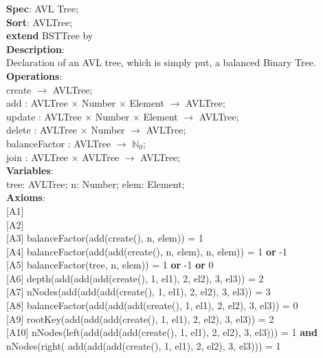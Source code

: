 \documentclass[12pt]{article}
\begin{document}
\begin{spacing}{1.5}
\noindent \textbf{Spec}: AVL Tree;\\
\noindent \textbf{Sort}: AVLTree;\\
\noindent \textbf{extend} BSTTree by\\
\noindent \textbf{Description}:\\Declaration of an AVL tree, which is simply put, a balanced Binary Tree.\\
\noindent \textbf{Operations}:\\
\hspace*{5mm} create $\rightarrow$ AVLTree;\\
\hspace*{5mm} add : AVLTree $\times$ Number $\times$ Element $\rightarrow$ AVLTree;\\
\hspace*{5mm} update : AVLTree $\times$ Number $\times$ Element $\rightarrow$ AVLTree;\\
\hspace*{5mm} delete : AVLTree $\times$ Number $\rightarrow$ AVLTree;\\
\hspace*{5mm} balanceFactor :  AVLTree $\rightarrow$ $\mathbb{N}_0$;\\
\hspace*{5mm} join : AVLTree $\times$ AVLTree $\rightarrow$ AVLTree;\\
\noindent \textbf{Variables}:\\
\hspace*{5mm} tree: AVLTree; n: Number; elem: Element;\\
\noindent \textbf{Axioms}:\\
\hspace*{5mm} [A1] \\
\hspace*{5mm} [A2] \\
\hspace*{5mm} [A3]  balanceFactor(add(create(), n, elem)) = 1\\
\hspace*{5mm} [A4]  balanceFactor(add(add(create(), n, elem), n, elem)) = 1 \textbf{or} -1\\
\hspace*{5mm} [A5]  balanceFactor(tree, n, elem)) = 1 \textbf{or} -1 \textbf{or} 0\\
\hspace*{5mm} [A6]  depth(add(add(add(create(), 1, el1), 2, el2), 3, el3)) = 2\\
\hspace*{5mm} [A7] nNodes(add(add(add(create(), 1, el1), 2, el2), 3, el3)) = 3\\
\hspace*{5mm} [A8] balanceFactor(add(add(add(create(), 1, el1), 2, el2), 3, el3)) = 0 \\
\hspace*{5mm} [A9] rootKey(add(add(add(create(), 1, el1), 2, el2), 3, el3)) = 2\\
\hspace*{5mm} [A10] nNodes(left(add(add(add(create(), 1, el1), 2, el2), 3, el3))) = 1 \textbf{and}  nNodes(right( add(add(add(create(), 1, el1), 2, el2), 3, el3))) = 1\\


\end{spacing}
\end{document}
